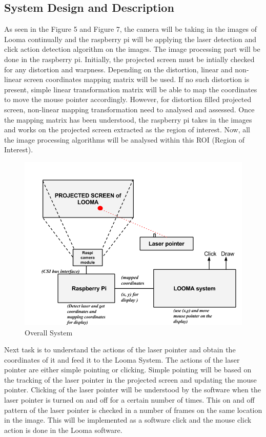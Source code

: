 \documentclass[12pt, a4paper]{article}
\begin{document}
\subsection{System Design and Description}
As seen in the Figure 5 and Figure 7, the camera will be taking in the images of Looma continually and the raspberry pi will be applying the laser detection and click action detection algorithm on the images. The image processing part will be done in the raspberry pi. Initially, the projected screen must be intially checked for any distortion and warpness. Depending on the distortion, linear and non-linear screen coordinates mapping matrix will be used. If no such distortion is present, simple linear transformation matrix will be able to map the coordinates to move the mouse pointer accordingly. However, for distortion filled projected screen, non-linear mapping transformation need to analysed and assessed. Once the mapping matrix has been understood, the raspberry pi takes in the images and works on the projected screen extracted as the region of interest. Now, all the image processing algorithms will be analysed within this ROI (Region of Interest).

\begin{figure}[htp]
\includegraphics[scale=0.5]{proposed_system}
\caption{Overall System}
\label{Proposed Block Diagram}
\end{figure}

Next task is to understand the actions of the laser pointer and obtain the coordinates of it and feed it to the Looma System. The actions of the laser pointer are either simple pointing or clicking. Simple pointing will be based on the tracking of the laser pointer in the projected screen and updating the mouse pointer. Clicking of the laser pointer will be understood by the software when the laser pointer is turned on and off for a certain number of times. This on and off pattern of the laser pointer is checked in a number of frames on the same location in the image. This will be implemented as a software click and the mouse click action is done in the Looma software. 
\end{document}
